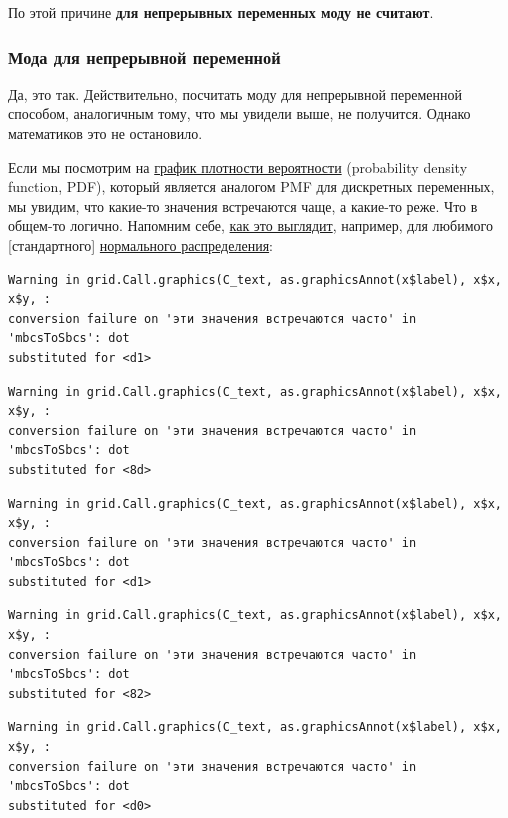 \documentclass[
  letterpaper,
  DIV=11,
  numbers=noendperiod]{scrreprt}
\theoremstyle{definition}
\theoremstyle{remark}
\begin{document}
По этой причине \textbf{для непрерывных переменных моду не считают}.

\subsubsection{Мода для непрерывной
переменной}\label{andan-descriptives-mode-contunious}

Да, это так. Действительно, посчитать моду для непрерывной переменной
способом, аналогичным тому, что мы увидели выше, не получится. Однако
математиков это не остановило.

Если мы посмотрим на \href{}{график плотности вероятности} (probability
density function, PDF), который является аналогом PMF для дискретных
переменных, мы увидим, что какие-то значения встречаются чаще, а
какие-то реже. Что в общем-то логично. Напомним себе, \href{}{как это
выглядит}, например, для любимого {[}стандартного{]} \href{}{нормального
распределения}:

\begin{verbatim}
Warning in grid.Call.graphics(C_text, as.graphicsAnnot(x$label), x$x, x$y, :
conversion failure on 'эти значения встречаются часто' in 'mbcsToSbcs': dot
substituted for <d1>
\end{verbatim}

\begin{verbatim}
Warning in grid.Call.graphics(C_text, as.graphicsAnnot(x$label), x$x, x$y, :
conversion failure on 'эти значения встречаются часто' in 'mbcsToSbcs': dot
substituted for <8d>
\end{verbatim}

\begin{verbatim}
Warning in grid.Call.graphics(C_text, as.graphicsAnnot(x$label), x$x, x$y, :
conversion failure on 'эти значения встречаются часто' in 'mbcsToSbcs': dot
substituted for <d1>
\end{verbatim}

\begin{verbatim}
Warning in grid.Call.graphics(C_text, as.graphicsAnnot(x$label), x$x, x$y, :
conversion failure on 'эти значения встречаются часто' in 'mbcsToSbcs': dot
substituted for <82>
\end{verbatim}

\begin{verbatim}
Warning in grid.Call.graphics(C_text, as.graphicsAnnot(x$label), x$x, x$y, :
conversion failure on 'эти значения встречаются часто' in 'mbcsToSbcs': dot
substituted for <d0>
\end{verbatim}
\end{document}
